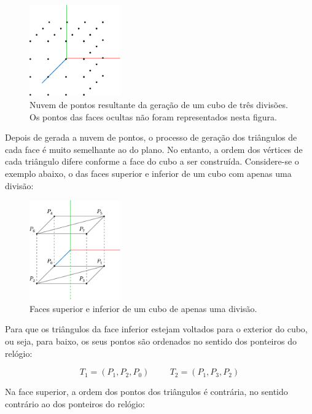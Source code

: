 \documentclass[12pt, a4paper]{article}
\begin{document}
\begin{figure}[H]
    \centering
    \includegraphics[width=0.35\textwidth]{res/figures/CubePoints.pdf}
    \caption{
        \onehalfspacing
        Nuvem de pontos resultante da geração de um cubo de três divisões. Os pontos das faces
        ocultas não foram representados nesta figura.
    }
\end{figure}

Depois de gerada a nuvem de pontos, o processo de geração dos triângulos de cada face é muito
semelhante ao do plano. No entanto, a ordem dos vértices de cada triângulo difere conforme a face do
cubo a ser construída. Considere-se o exemplo abaixo, o das faces superior e inferior de um cubo com
apenas uma divisão:

\begin{figure}[H]
    \centering
    \includegraphics[width=0.35\textwidth]{res/figures/CubeFaces.pdf}
    \caption{Faces superior e inferior de um cubo de apenas uma divisão.}
\end{figure}

Para que os triângulos da face inferior estejam voltados para o exterior do cubo, ou seja, para
baixo, os seus pontos são ordenados no sentido dos ponteiros do relógio:

$$
T_1 = (P_1, P_2, P_0)
\hspace{1cm}
T_2 = (P_1, P_3, P_2)
$$

Na face superior, a ordem dos pontos dos triângulos é contrária, no sentido contrário ao dos
ponteiros do relógio:
\end{document}
